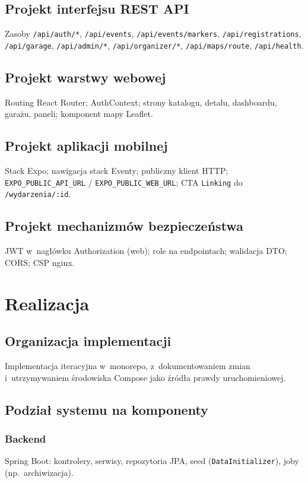 \documentclass{sprz}
\begin{document}
\section{Projekt interfejsu REST API}
Zasoby \texttt{/api/auth/*}, \texttt{/api/events}, \texttt{/api/events/markers}, \texttt{/api/registrations}, \texttt{/api/garage}, \texttt{/api/admin/*}, \texttt{/api/organizer/*}, \texttt{/api/maps/route}, \texttt{/api/health}.

\section{Projekt warstwy webowej}
Routing React Router; AuthContext; strony katalogu, detalu, dashboardu, garażu, paneli; komponent mapy Leaflet.

\section{Projekt aplikacji mobilnej}
Stack Expo; nawigacja stack Eventy; publiczny klient HTTP; \texttt{EXPO\_PUBLIC\_API\_URL} / \texttt{EXPO\_PUBLIC\_WEB\_URL}; CTA \texttt{Linking} do \texttt{/wydarzenia/:id}.

\section{Projekt mechanizmów bezpieczeństwa}
JWT w~nagłówku Authorization (web); role na endpointach; walidacja DTO; CORS; CSP nginx.

\chapter{Realizacja}
\section{Organizacja implementacji}
Implementacja iteracyjna w~monorepo, z~dokumentowaniem zmian i~utrzymywaniem środowiska Compose jako źródła prawdy uruchomieniowej.

\section{Podział systemu na komponenty}
\subsection{Backend}
Spring Boot: kontrolery, serwisy, repozytoria JPA, seed (\texttt{DataInitializer}), joby (np.\ archiwizacja).
\end{document}
